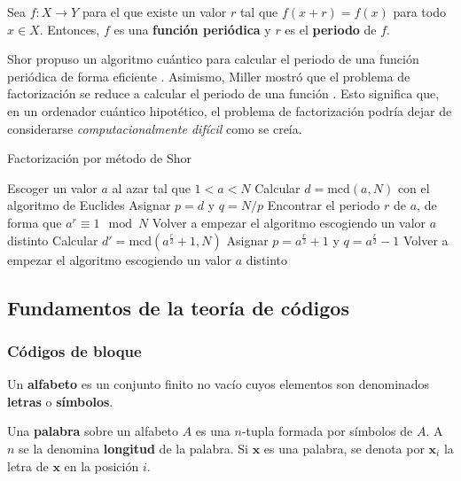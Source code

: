 \begin{definition}
	Sea $f : X \rightarrow Y$ para el que existe un valor $r$ tal que $f(x + r) = f(x)$ para todo $x \in X$. Entonces, $f$ es una \textbf{función periódica} y $r$ es el \textbf{periodo} de $f$.
\end{definition}

Shor propuso un algoritmo cuántico para calcular el periodo de una función periódica de forma eficiente \autocite{Shor_1997}. Asimismo, Miller mostró que el problema de factorización se reduce a calcular el periodo de una función \autocite{MILLER1976300}. Esto significa que, en un ordenador cuántico hipotético, el problema de factorización podría dejar de considerarse \textit{computacionalmente difícil} como se creía.

\begin{algorithm}
	\caption{Factorización por método de Shor}\label{}
	Escoger un valor $a$ al azar tal que $1 < a < N$\;
	Calcular $d = \mathrm{mcd}(a, N)$ con el algoritmo de Euclides\;
	{
		Asignar $p = d$ y $q = N/p$\;
	}
	{
		Encontrar el periodo $r$ de $a$, de forma que $a^r \equiv 1 \mod N$\;
		{
			Volver a empezar el algoritmo escogiendo un valor $a$ distinto\;
		}
		{
			Calcular $d' = \mathrm{mcd}(a^{\frac{r}{2}} + 1, N)$\;
			{
				Asignar $p = a^{\frac{r}{2}} + 1$ y $q = a^{\frac{r}{2}} - 1$\;
			}
			{
				Volver a empezar el algoritmo escogiendo un valor $a$ distinto\;
			}
		}
	}
\end{algorithm}

\newpage

\subsection{Fundamentos de la teoría de códigos}

\subsubsection{Códigos de bloque}

\begin{definition}
	Un \textbf{alfabeto} es un conjunto finito no vacío cuyos elementos son denominados \textbf{letras} o \textbf{símbolos}.
\end{definition}

\begin{definition}
	Una \textbf{palabra} sobre un alfabeto $A$ es una $n$-tupla formada por símbolos de $A$. A $n$ se la denomina \textbf{longitud} de la palabra. Si $\textbf{x}$ es una palabra, se denota por $\textbf{x}_i$ la letra de $\textbf{x}$ en la posición $i$.
\end{definition}

